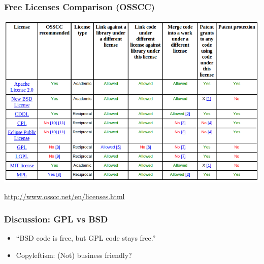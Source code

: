 \documentclass{beamer}
\begin{document}

\begin{frame}
\frametitle{Free Licenses Comparison (OSSCC)} 
\begin{center}
\includegraphics[scale=0.32,clip=true]{figs/licenses-comparison-osscc.png}

\medskip

\url{http://www.osscc.net/en/licenses.html}
\end{center}
\end{frame}

\begin{frame}
\frametitle{Discussion: GPL vs BSD}
\Large
\begin{itemize}
\item ``BSD code is free, but GPL code stays free.'' 

\pause

\item Copyleftism: (Not) business friendly? 

\end{itemize}
\end{frame}


\end{document}
